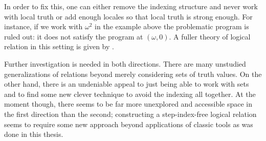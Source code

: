 In order to fix this, one can either remove the indexing structure and
never work with local truth or add enough locales so that local truth
is strong enough. For instance, if we work with $\omega^2$ in the
example above the problematic program is ruled out: it does not
satisfy the program at $(\omega, 0)$. A fuller theory of logical
relation in this setting is given by \citet{Svendsen:16}.

Further investigation is needed in both directions. There are many
unstudied generalizations of relations beyond merely considering sets
of truth values. On the other hand, there is an undeniable appeal to
just being able to work with sets and to find some new clever
technique to avoid the indexing all together. At the moment though,
there seems to be far more unexplored and accessible space in the
first direction than the second; constructing a step-index-free
logical relation seems to require some new approach beyond
applications of classic tools as was done in this thesis.

